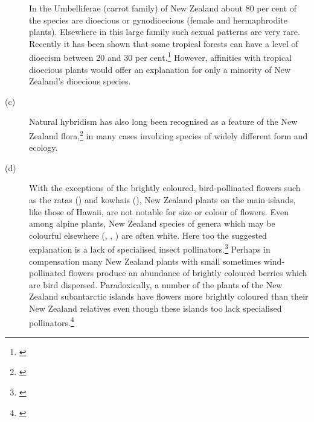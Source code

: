 \begin{description}
In the Umbelliferae (carrot family) of New Zealand about 80 per cent of the species are dioecious or gynodioecious (female and hermaphrodite plants).
Elsewhere in this large family such sexual patterns are very rare.
Recently it has been shown that some tropical forests can have a level of dioecism between 20 and 30 per cent.\footnote{\cite{bawa1979breeding}}
However, affinities with tropical dioecious plants would offer an explanation for only a minority of New Zealand's dioecious species.
\item[{(c)}]Natural hybridism has also long been recognised as a feature of  the New Zealand flora,\footnote{\cite{connor1985biosystematics}} in many cases involving species of widely different form and ecology.
\item[{(d)}]With the exceptions of the brightly coloured, bird-pollinated flowers such as the ratas () and kowhais (), New Zealand plants on the main islands, like those of Hawai{\okina}i, are not notable for size or colour of flowers.
Even among alpine plants, New Zealand species of genera which may be colourful elsewhere (, , ) are often white.
Here too the suggested explanation is a lack of specialised insect pollinators.\footnote{\cite{primack1983insect}} Perhaps in compensation many New Zealand plants with small sometimes wind-pollinated flowers produce an abundance of brightly coloured berries which are bird dispersed.
Paradoxically, a number of the plants of the New Zealand subantarctic islands have flowers more brightly coloured than their New Zealand relatives even though these islands too lack specialised pollinators.\footnote{\cite{godley1979flower}}
\end{description}

